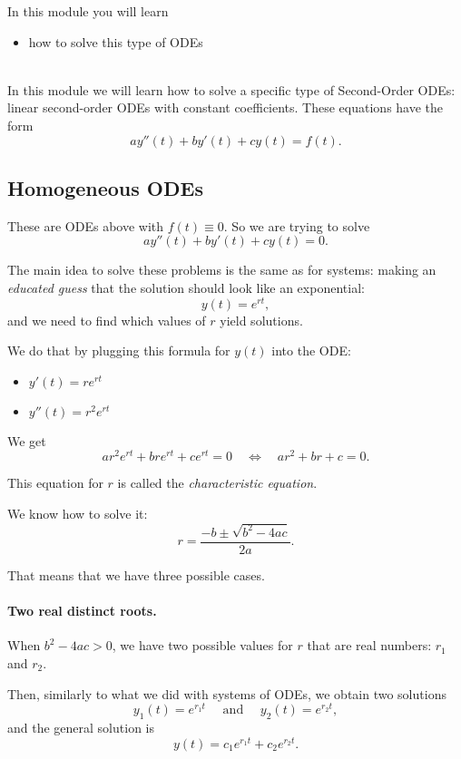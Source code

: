 In this module you will learn
\begin{itemize}
	\item how to solve this type of ODEs
\end{itemize}

\hfill \\

In this module we will learn how to solve a specific type of Second-Order ODEs: linear second-order ODEs with constant coefficients. These equations have the form
$$
a y''(t)  + b y'(t) + c y(t) = f(t).
$$

\subsection{Homogeneous ODEs}

These are ODEs above with $f(t) \equiv 0$.
So we are trying to solve
$$
a y''(t)  + b y'(t) + c y(t) = 0.
$$

The main idea to solve these problems is the same as for systems: making an \emph{educated guess} that the solution should look like an exponential:
$$
y(t) = e^{rt},
$$
and we need to find which values of $r$ yield solutions.

We do that by plugging this formula for $y(t)$ into the ODE:
\begin{itemize}
	\item $y'(t) = r e^{rt}$
	\item $y''(t) = r^2 e^{rt}$
\end{itemize}

We get
$$
a r^2 e^{rt} + br e^{rt} + c e^{rt} = 0
\quad \Leftrightarrow \quad 
	a r^2 + br + c = 0.
$$

This equation for $r$ is called the \emph{characteristic equation}.

We know how to solve it:
$$
r = \frac{-b \pm \sqrt{b^2-4ac}}{2a}.
$$

That means that we have three possible cases.





\paragraph{\color{cyan}Two real distinct roots.} When $b^2-4ac > 0$, we have two possible values for $r$ that are real numbers: $r_1$ and $r_2$.

Then, similarly to what we did with systems of ODEs, we obtain two solutions
$$
y_1(t) = e^{r_1 t} \quad \text{ and } \quad y_2(t) = e^{r_2 t},
$$
and the general solution is
$$
y(t) = c_1 e^{r_1 t} + c_2 e^{r_2 t}.
$$

